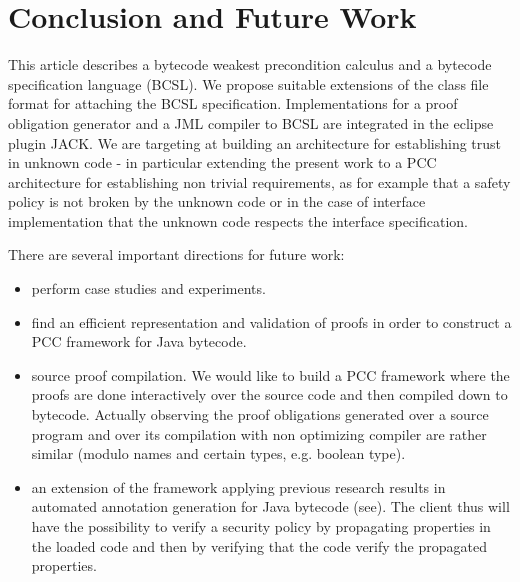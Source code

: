 \section{Conclusion and Future Work}\label{conclusion}
This article describes a bytecode weakest precondition calculus and a bytecode specification language (BCSL). We propose suitable extensions of the class file format for
attaching the BCSL specification. Implementations for a proof obligation generator and a JML compiler to BCSL are integrated in the eclipse plugin JACK. We are targeting at building an architecture for establishing trust in unknown code - in particular extending the present work to a PCC architecture for establishing non trivial requirements, as for example that a safety policy is not broken by the unknown code or in the case of interface implementation that the unknown code respects the interface specification.  


There are several important directions for future work:
\begin{itemize}
\item perform case studies and experiments.
\item find an efficient representation and validation of proofs in order to construct a PCC framework for Java bytecode. 
\item source proof compilation. We would like to build a PCC framework where the proofs are done interactively over the source code
and then compiled down to bytecode. Actually observing the proof obligations generated over a source program and over its compilation with non optimizing compiler are
rather similar (modulo names and certain types, e.g. boolean type).
\item an extension of the framework applying previous research results in automated annotation generation for Java bytecode (see\cite{PBBHL}). The client thus will have the possibility to verify a security policy by propagating properties in the loaded code and then by verifying that the code verify the propagated properties.

\end{itemize}

